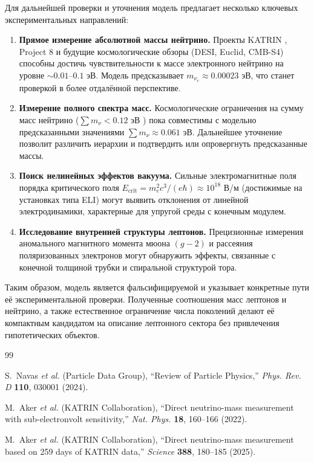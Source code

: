 \documentclass[12pt,a4paper]{article}
\begin{document}
Для дальнейшей проверки и уточнения модель предлагает несколько ключевых экспериментальных направлений:
\begin{enumerate}
    \item \textbf{Прямое измерение абсолютной массы нейтрино.} Проекты KATRIN \cite{katrin2022, katrin2025}, Project 8 и будущие космологические обзоры (DESI, Euclid, CMB-S4) способны достичь чувствительности к массе электронного нейтрино на уровне $\sim 0.01\text{--}0.1$ эВ. Модель предсказывает $m_{\nu_e} \approx 0.00023$ эВ, что станет проверкой в более отдалённой перспективе.
    \item \textbf{Измерение полного спектра масс.} Космологические ограничения на сумму масс нейтрино ($\sum m_\nu < 0.12$ эВ \cite{pdg2024}) пока совместимы с модельно предсказанными значениями $\sum m_\nu \approx 0.061$ эВ. Дальнейшее уточнение позволит различить иерархии и подтвердить или опровергнуть предсказанные массы.
    \item \textbf{Поиск нелинейных эффектов вакуума.} Сильные электромагнитные поля порядка критического поля $E_{\text{crit}} = m_e^2 c^3 / (e\hbar) \approx 10^{18}$ В/м (достижимые на установках типа ELI) могут выявить отклонения от линейной электродинамики, характерные для упругой среды с конечным модулем.
    \item \textbf{Исследование внутренней структуры лептонов.} Прецизионные измерения аномального магнитного момента мюона $(g-2)$ и рассеяния поляризованных электронов могут обнаружить эффекты, связанные с конечной толщиной трубки и спиральной структурой тора.
\end{enumerate}

Таким образом, модель является фальсифицируемой и указывает конкретные пути её экспериментальной проверки. Полученные соотношения масс лептонов и нейтрино, а также естественное ограничение числа поколений делают её компактным кандидатом на описание лептонного сектора без привлечения гипотетических объектов.

\begin{thebibliography}{99}

S.~Navas \textit{et al.} (Particle Data Group), ``Review of Particle Physics,'' \textit{Phys. Rev. D} \textbf{110}, 030001 (2024).

M.~Aker \textit{et al.} (KATRIN Collaboration), ``Direct neutrino-mass measurement with sub-electronvolt sensitivity,'' \textit{Nat. Phys.} \textbf{18}, 160--166 (2022).

M.~Aker \textit{et al.} (KATRIN Collaboration), ``Direct neutrino-mass measurement based on 259 days of KATRIN data,'' \textit{Science} \textbf{388}, 180--185 (2025).

\end{thebibliography}
\end{document}
